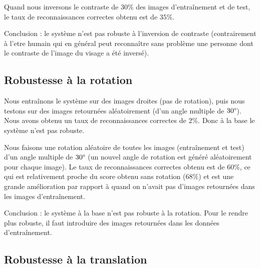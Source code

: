 Quand nous inversons le contraste de $30\%$ des images d'entraînement et de test, le taux de
reconnaissances correctes obtenu est de $35\%$.

Conclusion : le système n'est pas robuste à l'inversion de contraste (contrairement à l'etre
humain qui en général peut reconnaître sans problème une personne dont le contraste de l'image
du visage a été inversé).


\subsection{Robustesse à la rotation}
Nous entraînons le système sur des images droites (pas de rotation), puis nous testons sur des images
retournées aléatoirement (d'un angle multiple de $30\degree$). Nous avons obtenu un taux de
reconnaissances correctes de $2\%$. Donc à la base le système n'est pas robuste.

Nous faisons une rotation aléatoire de toutes les images (entraînement et test) d'un angle
multiple de $30\degree$ (un nouvel   angle de rotation est généré aléatoirement pour chaque
image). Le taux de reconnaissances correctes obtenu est de $60\%$, ce qui est relativement
proche du score obtenu sans rotation ($68\%$) et est une grande amélioration par rapport à
quand on n'avait pas d'images retournées dans les images d'entraînement.

Conclusion : le système à la base n'est pas robuste à la rotation. Pour le rendre plus robuste,
il faut introduire des images retournées dans les données d'entraînement.


\subsection{Robustesse à la translation}
